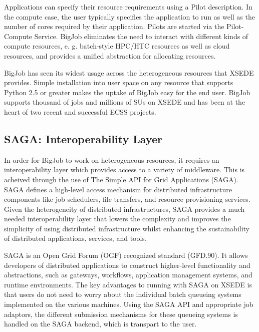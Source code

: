 \documentclass{sig-alternate}
\begin{document}
Applications can specify their resource requirements using a Pilot
description. In the compute case, the user typically specifies the
application to run as well as the number of cores required by their
application.  Pilots are started via the Pilot-Compute Service. BigJob 
eliminates the need to interact with different kinds of compute
resources, e. g. batch-style HPC/HTC resources as well as cloud
resources, and provides a unified abstraction for allocating
resources. 

BigJob has seen its widest usage across the heterogeneous resources
that XSEDE provides. Simple installation into user space on any
resource that supports Python 2.5 or greater makes the uptake of
BigJob easy for the end user. BigJob supports thousand of jobs and
millions of SUs on XSEDE and has been at the heart of two recent and
successful ECSS projects.


\subsection{SAGA: Interoperability Layer}

In order for BigJob to work on heterogeneous resources, it requires an
interoperability layer which provides access to a variety of
middleware.  This is acheived through the use of The Simple API for Grid Applications (SAGA).
SAGA defines a 
high-level access mechanism for distributed infrastructure components 
like job schedulers, file transfers, and resource provisioning services. 
Given the heterogeneity of distributed infrastructures, SAGA provides 
a much needed interoperability layer that lowers the complexity and 
improves the simplicity of using distributed infrastructure whilst 
enhancing the sustainability of distributed applications, services, and tools.

SAGA is an Open Grid Forum (OGF) recognized standard (GFD.90). 
It allows developers of distributed applications to construct
higher-level functionality and abstractions, such as
gateways, workflows, application management systems, and runtime
environments. The key advantages to running with SAGA on XSEDE
is that users do not need to worry about the individual batch
queueing systems implemented on the various machines. Using the 
SAGA API and appropriate job adaptors, the different submission
mechanisms for these queueing systems is handled on the SAGA backend,
which is transpart to the user.
\end{document}

